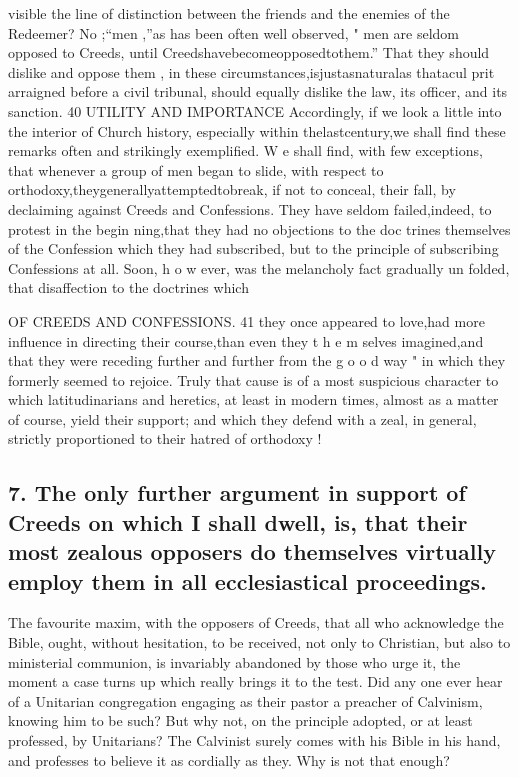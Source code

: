 \documentclass[
]{book}
\begin{document}
visible the line of distinction between the friends and the enemies of the Redeemer? No ;``men ,''as has been often well observed, " men are seldom opposed to Creeds, until Creedshavebecomeopposedtothem.'' That they should dislike and oppose them , in these
circumstances,isjustasnaturalas thatacul prit arraigned before a civil tribunal, should equally dislike the law, its officer, and its sanction.
40 UTILITY AND IMPORTANCE
Accordingly, if we look a little into the interior of Church history, especially within thelastcentury,we shall find these remarks
often and strikingly exemplified. W e shall find, with few exceptions, that whenever a group of men began to slide, with respect to orthodoxy,theygenerallyattemptedtobreak, if not to conceal, their fall, by declaiming against Creeds and Confessions. They have
seldom failed,indeed, to protest in the begin ning,that they had no objections to the doc trines themselves of the Confession which
they had subscribed, but to the principle of subscribing Confessions at all. Soon, h o w ever, was the melancholy fact gradually un folded, that disaffection to the doctrines which

OF CREEDS AND CONFESSIONS. 41
they once appeared to love,had more influence in directing their course,than even they t h e m selves imagined,and that they were receding further and further from the g o o d way " in
which they formerly seemed to rejoice. Truly that cause is of a most suspicious character to which latitudinarians and heretics, at least in modern times, almost as a matter of course, yield their support; and which they defend
with a zeal, in general, strictly proportioned to their hatred of orthodoxy !

\hypertarget{the-only-further-argument-in-support-of-creeds-on-which-i-shall-dwell-is-that-their-most-zealous-opposers-do-themselves-virtually-employ-them-in-all-ecclesiastical-proceedings.}{%
\subsection{7. The only further argument in support of Creeds on which I shall dwell, is, that their most zealous opposers do themselves virtually employ them in all ecclesiastical proceedings.}\label{the-only-further-argument-in-support-of-creeds-on-which-i-shall-dwell-is-that-their-most-zealous-opposers-do-themselves-virtually-employ-them-in-all-ecclesiastical-proceedings.}}

The favourite maxim, with the opposers of Creeds, that all who acknowledge the Bible, ought, without hesitation, to be received, not only to Christian, but also to ministerial communion, is invariably abandoned by those who urge it, the moment a case turns up which really brings it to the test. Did any one ever hear of a Unitarian congregation engaging as their pastor a preacher of Calvinism, knowing him to be such? But why not, on the principle adopted, or at least professed, by Unitarians? The Calvinist surely comes with his Bible in his hand, and professes to believe it as cordially as they. Why is not that enough?
\end{document}
